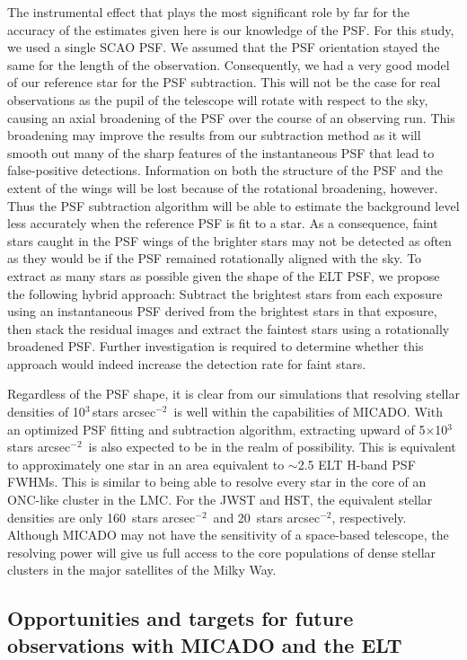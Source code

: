 \documentclass[referee]{aa}
\newcommand{\s}{$\sim$}
\newcommand{\h}[1]{$^{#1}$}
\newcommand{\spa}{stars arcsec$^{-2}$~}
\newcommand{\spae}{stars arcsec$^{-2}$}
\begin{document}
The instrumental effect that plays the most significant role by far for the accuracy of the estimates given here is our knowledge of the PSF\@.
For this study, we used a single SCAO PSF\@.
We assumed that the PSF orientation stayed the same for the length of the observation.
Consequently, we had a very good model of our reference star for the PSF subtraction.
This will not be the case for real observations as the pupil of the telescope will rotate with respect to the sky, causing an axial broadening of the PSF over the course of an observing run.
This broadening may improve the results from our subtraction method as it will smooth out many of the sharp features of the instantaneous PSF that lead to false-positive detections.
Information on both the structure of the PSF and the extent of the wings will be lost because of the rotational broadening, however.
Thus the PSF subtraction algorithm will be able to estimate the background level less accurately when the reference PSF is fit to a star.
As a consequence, faint stars caught in the PSF wings of the brighter stars may not be detected as often as they would be if the PSF remained rotationally aligned with the sky.
To extract as many stars as possible given the shape of the ELT PSF, we propose the following hybrid approach: Subtract the brightest stars from each exposure using an instantaneous PSF derived from the brightest stars in that exposure, then stack the residual images and extract the faintest stars using a rotationally broadened PSF\@.
Further investigation is required to determine whether this approach would indeed increase the detection rate for faint stars.

Regardless of the PSF shape, it is clear from our simulations that resolving stellar densities of 10\h3\,\spa is well within the capabilities of MICADO\@.
With an optimized PSF fitting and subtraction algorithm, extracting upward of 5$\times$10\h3\,\spa is also expected to be in the realm of possibility.
This is equivalent to approximately one star in an area equivalent to \s2.5 ELT H-band PSF FWHMs.
This is similar to being able to resolve every star in the core of an ONC-like cluster in the LMC\@.
For the JWST and HST, the equivalent stellar densities are only 160~\spa and 20~\spae, respectively.
Although MICADO may not have the sensitivity of a space-based telescope, the resolving power will give us full access to the core populations of dense stellar clusters in the major satellites of the Milky Way.


\subsection{Opportunities and targets for future observations with MICADO and the ELT}
  \label{subsec:future_opportunities}
\end{document}
